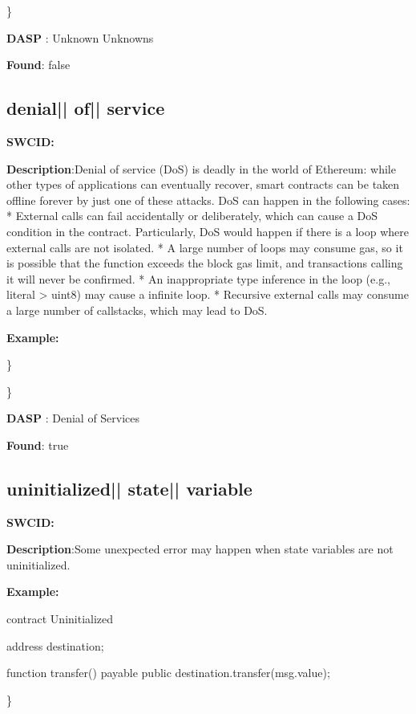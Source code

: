 \documentclass{article}
\begin{document}
\} 

\textbf{DASP} : Unknown Unknowns

\textbf{Found}: false

\subsection{denial{|\textunderscore| }of{|\textunderscore| }service} 
\textbf{SWC{\textunderscore }ID:} 

\textbf{Description}:Denial of service (DoS) is deadly in the world of Ethereum: while other types of applications can eventually recover, smart contracts can be taken offline forever by just one of these attacks. DoS can happen in the following cases:
* External calls can fail accidentally or deliberately, which can cause a DoS condition in the contract. Particularly, DoS would happen if there is a loop where external calls are not isolated.
* A large number of loops may consume gas, so it is possible that the function exceeds the block gas limit, and transactions calling it will never be confirmed.
* An inappropriate type inference in the loop (e.g., literal {\textendash}> uint8) may cause a infinite loop.
* Recursive external calls may consume a large number of callstacks, which may lead to DoS.


\textbf{Example:} 
\begin{ffcode} 

for (var i = 0; i < array.length; i++) { /* ... */

\end{ffcode} 
\} 

\} 

\textbf{DASP} : Denial of Services

\textbf{Found}: true

\subsection{uninitialized{|\textunderscore| }state{|\textunderscore| }variable} 
\textbf{SWC{\textunderscore }ID:} 

\textbf{Description}:Some unexpected error may happen when state variables are not uninitialized.


\textbf{Example:} 
\begin{ffcode} 

contract Uninitialized{
    address destination;

    function transfer() payable public{
        destination.transfer(msg.value);
    }
}

\end{ffcode} 
\} 
\end{document}
